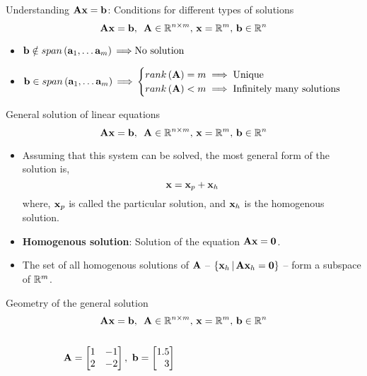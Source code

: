 \documentclass[aspectratio=169]{beamer}
\let\olditem\item
\renewcommand{\item}{\setlength{\itemsep}{\fill}\olditem}
\def\mf{\ensuremath\mathbf}
\def\mb{\ensuremath\mathbb}
\def\lp{\ensuremath\left(}
\def\rp{\ensuremath\right)}
\def\lc{\ensuremath\left\{}
\def\rc{\ensuremath\right\}}
\def\bmx{\ensuremath\begin{bmatrix*}[r]}
\def\emx{\ensuremath\end{bmatrix*}}
\begin{document}
\begin{frame}[t]{Understanding $\mf{A}\mf{x} = \mf{b}$: Conditions for different types of solutions}
\[ \mf{A}\mf{x} = \mf{b}, \,\,\, \mf{A} \in \mb{R}^{n \times m}, \, \mf{x} = \mb{R}^m, \, \mf{b} \in \mb{R}^n \]
\vspace{0.5cm}
\begin{itemize}
  \item $\mf{b} \notin span\lp \mf{a}_1, \ldots \mf{a}_m \rp {\implies} \text{No solution}$
  \vspace{-2cm}
  \item $\mf{b} \in span\lp \mf{a}_1, \ldots \mf{a}_m \rp {\implies} \begin{cases}
        rank\lp \mf{A} \rp = m \implies \text{Unique} \\
        rank\lp \mf{A} \rp < m \implies \text{Infinitely many solutions}
        \end{cases}$
\end{itemize}
\end{frame}

\begin{frame}[t]{General solution of linear equations}
\[ \mf{A}\mf{x} = \mf{b}, \,\,\, \mf{A} \in \mb{R}^{n \times m}, \, \mf{x} = \mb{R}^m, \, \mf{b} \in \mb{R}^n \]

\begin{itemize}
  \item Assuming that this system can be solved, the most general form of the solution is,
  \[ \mf{x} = \mf{x}_p + \mf{x}_h \]
  where, $\mf{x}_p$ is called the particular solution, and $\mf{x}_h$ is the homogenous solution.

  \item \textbf{Homogenous solution}: Solution of the equation $\mf{A}\mf{x} = \mf{0}$.

  \item The set of all homogenous solutions of $\mf{A}$ -- $\lc \mf{x}_h \, \vert \, \mf{A}\mf{x}_h = \mf{0} \rc$ -- form a subspace of $\mb{R}^m$.
\end{itemize}
\end{frame}

\begin{frame}[t]{Geometry of the general solution}
\[ \mf{A}\mf{x} = \mf{b}, \,\,\, \mf{A} \in \mb{R}^{n \times m}, \, \mf{x} = \mb{R}^m, \, \mf{b} \in \mb{R}^n \]
\begin{columns}[t]
\begin{column}{0.3\textwidth}
\[ \mf{A} = \bmx
1 & -1\\
2 & -2
\emx, \,\, \mf{b} = \bmx
1.5\\
3
\emx \]
\end{column}
\hspace{0.5cm}
\begin{column}{0.6\textwidth}
\end{column}
\end{columns}
\end{frame}
\end{document}
